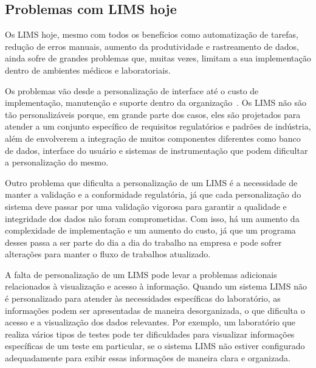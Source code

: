 \subsection{Problemas com LIMS hoje}


Os LIMS hoje, mesmo com todos os benefícios como automatização de tarefas, redução de erros manuais, aumento da produtividade e rastreamento de dados, ainda sofre de grandes problemas que, muitas vezes, limitam a sua implementação dentro de ambientes médicos e laboratoriais.

Os problemas vão desde a personalização de interface até o custo de implementação, manutenção e suporte dentro da organização~\cite{Avery2000ProductGuide., CommmonAstrix}.
Os LIMS não são tão personalizáveis porque, em grande parte dos casos, eles são projetados para atender a um conjunto específico de requisitos regulatórios e padrões de indústria, além de envolverem a integração de muitos componentes diferentes como banco de dados, interface do usuário e sistemas de instrumentação que podem dificultar a personalização do mesmo.

Outro problema que dificulta a personalização de um LIMS é a necessidade de manter a validação e a conformidade regulatória, já que cada personalização do sistema deve passar por uma validação vigorosa para garantir a qualidade e integridade dos dados não foram comprometidas.
Com isso, há um aumento da complexidade de implementação e um aumento do custo, já que um programa desses passa a ser parte do dia a dia do trabalho na empresa e pode sofrer alterações para manter o fluxo de trabalhos atualizado.



A falta de personalização de um LIMS pode levar a problemas adicionais relacionados à visualização e acesso à informação. Quando um sistema LIMS não é personalizado para atender às necessidades específicas do laboratório, as informações podem ser apresentadas de maneira desorganizada, o que dificulta o acesso e a visualização dos dados relevantes. Por exemplo, um laboratório que realiza vários tipos de testes pode ter dificuldades para visualizar informações específicas de um teste em particular, se o sistema LIMS não estiver configurado adequadamente para exibir essas informações de maneira clara e organizada.


